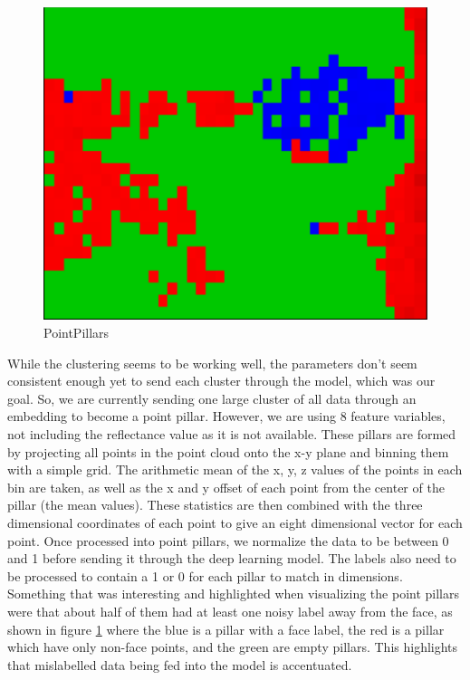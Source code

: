 \documentclass{article}
\begin{document}
\begin{figure}[htp]
    \centering
    \includegraphics[scale=0.8]{pointPillars.png}
    \caption{PointPillars}
    \label{fig:pointPillars}
\end{figure}
While the clustering seems to be working well, the parameters don't seem consistent enough yet to send each cluster through the model, which was our goal. So, we are currently sending one large cluster of all data through an embedding to become a point pillar\cite{pointpillars}. However, we are using 8 feature variables, not including the reflectance value as it is not available. These pillars are formed by projecting all points in the point cloud onto the x-y plane and binning them with a simple grid. The arithmetic mean of the x, y, z values of the points in each bin are taken, as well as the x and y offset of each point from the center of the pillar (the mean values). These statistics are then combined with the three dimensional coordinates of each point to give an eight dimensional vector for each point. Once processed into point pillars, we normalize the data to be between 0 and 1 before sending it through the deep learning model. The labels also need to be processed to contain a 1 or 0 for each pillar to match in dimensions. Something that was interesting and highlighted when visualizing the point pillars were that about half of them had at least one noisy label away from the face, as shown in figure \ref{fig:pointPillars} where the blue is a pillar with a face label, the red is a pillar which have only non-face points, and the green are empty pillars. This highlights that mislabelled data being fed into the model is accentuated. 
\end{document}
